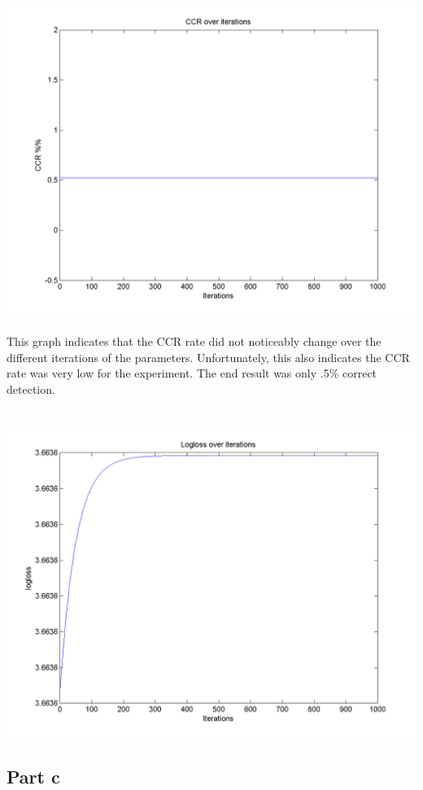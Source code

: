 \documentclass[paper=a4, fontsize=11pt]{scrartcl} %
\numberwithin{equation}{section} %
\numberwithin{figure}{section} %
\numberwithin{table}{section} %
\begin{document}
	\includegraphics[scale=.8]{CCR}
	\\\\
	This graph indicates that the CCR rate did not noticeably change over the different iterations of the parameters. Unfortunately, this also indicates the CCR rate was very low for the experiment. The end result was only .5\% correct detection.
	\\\\\\
	\includegraphics[scale=0.8]{logloss}

	\subsection{Part c}
\end{document}
